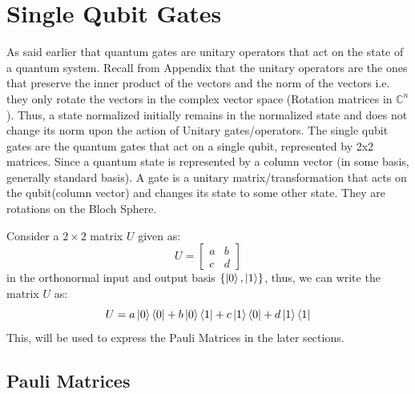 \section{Single Qubit Gates}
As said earlier that quantum gates are unitary operators that act on the state of a quantum system. 
Recall from Appendix that the unitary operators are the ones that preserve the inner product of the vectors and the norm of the vectors i.e. they 
only rotate the vectors in the complex vector space (Rotation matrices in $\mathbb{C}^n$). Thus, a state normalized initially remains in the normalized state and does not change its norm 
upon the action of Unitary gates/operators.
The single qubit gates are the quantum gates that act on a single qubit, represented by 2x2 matrices. Since a quantum state is represented by a column vector (in some basis, generally standard basis). 
A gate is a unitary matrix/transformation 
that acts on the qubit(column vector) and changes its state to some other state.
They are rotations on the Bloch Sphere.
\begin{example}
    Consider a $2 \times 2$ matrix $U$ given as:
    \[
        U=\begin{bmatrix}
            a & b \\
            c & d
        \end{bmatrix}
    \]
    in the orthonormal input and output basis $\{\ket{0},\ket{1}\}$, thus, we can write the matrix $U$ as:
    \[
        U=a\ket{0}\bra{0}+b\ket{0}\bra{1}+c\ket{1}\bra{0}+d\ket{1}\bra{1}
    \]
    This, will be used to express the Pauli Matrices in the later sections.
\end{example}

\subsection{Pauli Matrices}
